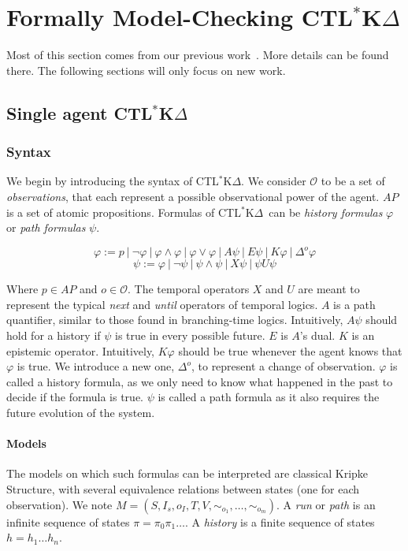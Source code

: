 \documentclass[dvipsnames]{acmart}
\def\ctlskd{CTL$^{*}$K$\Delta$}
\def\A{\mathit{A}}
\def\E{\mathit{E}}
\def\U{\mathit{U}}
\def\X{\mathit{X}}
\def\K{\mathit{K}}
\def\D#1{\Delta^{#1}}
\def\eqstate#1{\sim_{#1}}
\begin{document}
\section{Formally Model-Checking \ctlskd}
\label{formal}
Most of this section comes from our previous work~\cite{KR18,internship}. More details can be found there.
The following sections will only focus on new work.

\subsection{Single agent \ctlskd}
\subsubsection{Syntax}

We begin by introducing the syntax of \ctlskd. 
We consider $\mathcal{O}$ to be a set of \textit{observations}, that each represent a possible observational power of the agent. $\mathit{AP}$ is a set of atomic propositions.
Formulas of \ctlskd\ can be \textit{history formulas} $\varphi$ or \textit{path formulas} $\psi$.

$$\varphi := p ~|~ \neg \varphi ~|~ \varphi\wedge\varphi ~|~ \varphi\vee\varphi ~|~ \A\psi ~|~ \E\psi ~|~ \K\varphi ~|~ \D{o}\varphi$$
$$\psi := \varphi ~|~ \neg\psi ~|~ \psi\wedge\psi ~|~ \X\psi ~|~ \psi\U\psi$$

Where $p\in\mathit{AP}$ and $o\in\mathcal{O}$.
The temporal operators $\X$ and $\U$ are meant to represent the typical \textit{next} and \textit{until} operators of temporal logics.
$\A$ is a path quantifier, similar to those found in branching-time logics. Intuitively, $\A\psi$ should hold for a history if $\psi$ is true in every possible future. $\E$ is $\A$'s dual.
$\K$ is an epistemic operator. Intuitively, $\K\varphi$ should be true whenever the agent knows that $\varphi$ is true. We introduce a new one, $\D{o}$, to represent a change of observation.
$\varphi$ is called a history formula, as we only need to know what happened in the past to decide if the formula is true. $\psi$ is called a path formula as it also requires the future evolution of the system.

\paragraph{Models}
The models on which such formulas can be interpreted are classical Kripke Structure, with several equivalence relations between states (one for each observation). We note $M=(S,I_s,o_I,T,V,\eqstate{o_1},\dots,\eqstate{o_m})$.
A \textit{run} or \textit{path} is an infinite sequence of states $\pi=\pi_0\pi_1\dots$. A \textit{history} is a finite sequence of states $h=h_1\dots h_n$.
\end{document}
